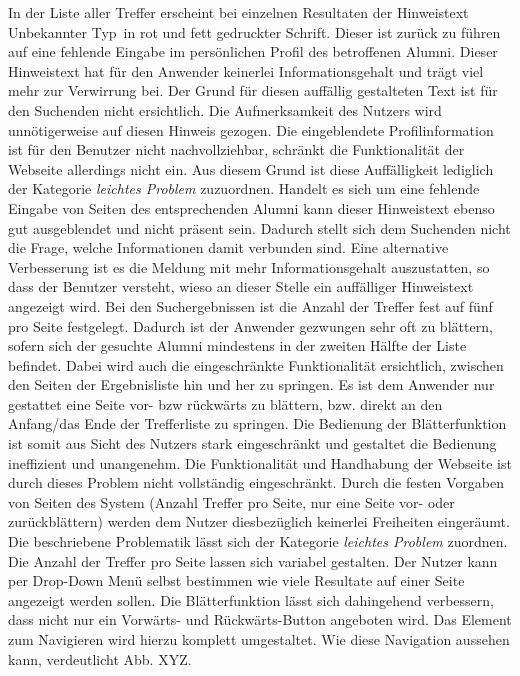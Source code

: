 {
	In der Liste aller Treffer erscheint bei einzelnen Resultaten der Hinweistext \glqq Unbekannter Typ\grqq ~in rot und fett gedruckter Schrift. Dieser ist zurück zu führen auf eine  fehlende Eingabe im persönlichen Profil des betroffenen Alumni. Dieser Hinweistext hat für den Anwender keinerlei Informationsgehalt und trägt viel mehr zur Verwirrung bei. Der Grund für diesen auffällig gestalteten Text ist für den Suchenden nicht ersichtlich. Die Aufmerksamkeit des Nutzers wird unnötigerweise auf diesen Hinweis gezogen.
}
{
	 Die eingeblendete Profilinformation ist für den Benutzer nicht nachvollziehbar, schränkt die Funktionalität der Webseite allerdings nicht ein. Aus diesem Grund ist diese Auffälligkeit lediglich der Kategorie \emph{leichtes Problem} zuzuordnen.
}
{
	Handelt es sich um eine fehlende Eingabe von Seiten des entsprechenden Alumni kann dieser Hinweistext ebenso gut ausgeblendet und nicht präsent sein. Dadurch stellt sich dem Suchenden nicht die Frage, welche Informationen damit verbunden sind. Eine alternative Verbesserung ist es die Meldung mit mehr Informationsgehalt auszustatten, so dass der Benutzer versteht, wieso an dieser Stelle ein auffälliger Hinweistext angezeigt wird.
}
{
	Bei den Suchergebnissen ist die Anzahl der Treffer fest auf fünf pro Seite festgelegt. Dadurch ist der Anwender gezwungen sehr oft zu blättern, sofern sich der gesuchte Alumni mindestens in der zweiten Hälfte der Liste befindet. Dabei wird auch die eingeschränkte Funktionalität ersichtlich, zwischen den Seiten der Ergebnisliste hin und her zu springen. Es ist dem Anwender nur gestattet eine Seite vor- bzw rückwärts zu blättern, bzw. direkt an den Anfang/das Ende der Trefferliste zu springen. Die Bedienung der Blätterfunktion ist somit aus Sicht des Nutzers stark eingeschränkt und gestaltet die Bedienung ineffizient und unangenehm.
}
{
	Die Funktionalität und Handhabung der Webseite ist durch dieses Problem nicht vollständig eingeschränkt. Durch die festen Vorgaben von Seiten des System (Anzahl Treffer pro Seite, nur eine Seite vor- oder zurückblättern) werden dem Nutzer diesbezüglich keinerlei Freiheiten eingeräumt. Die beschriebene Problematik lässt sich der Kategorie \emph{leichtes Problem} zuordnen.
	}
{
	Die Anzahl der Treffer pro Seite lassen sich variabel gestalten. Der Nutzer kann per Drop-Down Menü selbst bestimmen wie viele Resultate auf einer Seite angezeigt werden sollen. Die Blätterfunktion lässt sich dahingehend verbessern, dass nicht nur ein Vorwärts- und Rückwärts-Button angeboten wird. Das Element zum Navigieren wird hierzu komplett umgestaltet. Wie diese Navigation aussehen kann, verdeutlicht Abb. XYZ.
}